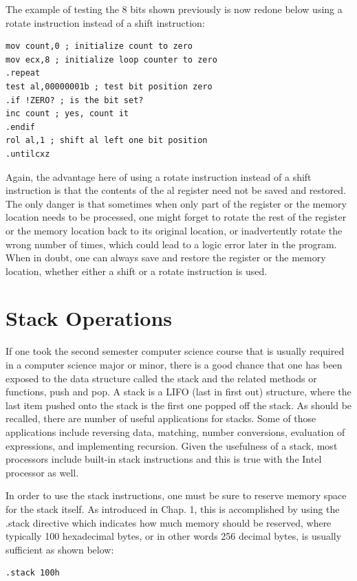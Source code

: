 \documentclass[10pt]{book}
\begin{document}
The example of testing the 8 bits shown previously is now redone below using a rotate instruction instead of a shift instruction:

\begin{verbatim}
mov count,0 ; initialize count to zero
mov ecx,8 ; initialize loop counter to zero
.repeat
test al,00000001b ; test bit position zero
.if !ZERO? ; is the bit set?
inc count ; yes, count it
.endif
rol al,1 ; shift al left one bit position
.untilcxz
\end{verbatim}

Again, the advantage here of using a rotate instruction instead of a shift instruction is that the contents of the al register need not be saved and restored. The only danger is that sometimes when only part of the register or the memory location needs to be processed, one might forget to rotate the rest of the register or the memory location back to its original location, or inadvertently rotate the wrong number of times, which could lead to a logic error later in the program. When in doubt, one can always save and restore the register or the memory location, whether either a shift or a rotate instruction is used.

\section{Stack Operations}
If one took the second semester computer science course that is usually required in a computer science major or minor, there is a good chance that one has been exposed to the data structure called the stack and the related methods or functions, push and pop. A stack is a LIFO (last in first out) structure, where the last item pushed onto the stack is the first one popped off the stack. As should be recalled, there are number of useful applications for stacks. Some of those applications include reversing data, matching, number conversions, evaluation of expressions, and implementing recursion. Given the usefulness of a stack, most processors include built-in stack instructions and this is true with the Intel processor as well.

In order to use the stack instructions, one must be sure to reserve memory space for the stack itself. As introduced in Chap. 1, this is accomplished by using the .stack directive which indicates how much memory should be reserved, where typically 100 hexadecimal bytes, or in other words 256 decimal bytes, is usually sufficient as shown below:

\begin{verbatim}
.stack 100h
\end{verbatim}
\end{document}
